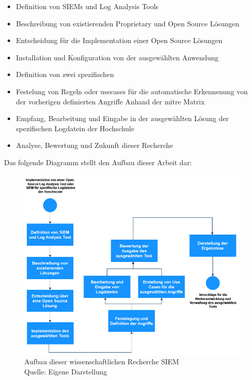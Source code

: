 \begin{itemize}[noitemsep]
   \item Definition von \glspl{SIEM} und Log Analysis Tools
   \item Beschreibung von existierenden \gls{Proprietary} und \gls{Open Source} Lösungen
   \item Entscheidung für die Implementation einer \gls{Open Source} Lösungen
   \item Installation und Konfiguration von der ausgewählten Anwendung 
   \item Definition von zwei spezifischen 
   \item Festelung von Regeln oder \gls{usecases} für die automatische Erkennenung von der vorherigen definierten Angriffe Anhand der \gls{mitre} Matrix
   \item Empfang, Bearbeitung und Eingabe in der ausgewählten Lösung der spezifischen Logdatein der Hochschule
   \item Analyse, Bewertung und Zukunft dieser Recherche
\end{itemize}

Das folgende Diagramm stellt den Aufbau dieser Arbeit dar:


\begin{figure}[H]
   \centering
   \includegraphics[width=1\textwidth]{assets/1_p1.jpg}
   \caption{Aufbau dieser wissenschaftlichen Recherche \gls{SIEM} \\Quelle: Eigene Darstellung }
   \centering
\end{figure}

